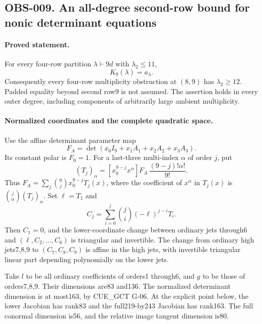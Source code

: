 \subsection{OBS-009. An all-degree second-row bound for nonic determinant equations}

\paragraph{Proved statement.}
For every four-row partition $\lambda\vdash9d$ with
$\lambda_2\leq11$,
\[
                         K_9(\lambda)=a_\lambda.
\tag{OBS-009.1}
\]
Consequently every four-row multiplicity obstruction at $(8,9)$ has
$\lambda_2\geq12$. Padded equality beyond second row9 is not assumed.
The assertion holds in every outer degree, including components of
arbitrarily large ambient multiplicity.

\paragraph{Normalized coordinates and the complete quadratic space.}
Use the affine determinant parameter map
\[
 F_A=\det(x_0I_9+x_1A_1+x_2A_2+x_3A_3).
\]
Its constant polar is $F_0=1$. For a last-three multi-index $\alpha$
of order $j$, put
\[
 (T_j)_\alpha=
 [x_0^{9-j}x^\alpha]F_A\,\frac{(9-j)!\alpha!}{9!}.
\]
Thus $F_A=\sum_j\binom9j x_0^{9-j}T_j(x)$, where the coefficient
of $x^\alpha$ in $T_j(x)$ is $\binom j\alpha(T_j)_\alpha$.
Set $\ell=T_1$ and
\[
 C_j=\sum_{i=0}^j\binom ji(-\ell)^{j-i}T_i.
\tag{OBS-009.2}
\]
Then $C_1=0$, and the lower-coordinate change between ordinary jets
through6 and $(\ell,C_2,\ldots,C_6)$ is triangular and invertible.
The change from ordinary high jets7,8,9 to $(C_7,C_8,C_9)$ is affine
in the high jets, with invertible triangular linear part depending
polynomially on the lower jets.

Take $l$ to be all ordinary coefficients of orders1 through6, and
$g$ to be those of orders7,8,9. Their dimensions are83 and136.
The normalized determinant dimension is at most163, by CUE\_GCT G-06.
At the explicit point below, the lower Jacobian has rank83 and the
full219-by243 Jacobian has rank163. The full conormal dimension is56,
and the relative image tangent dimension is80.

